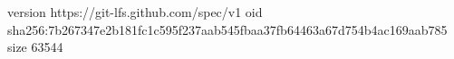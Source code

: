 version https://git-lfs.github.com/spec/v1
oid sha256:7b267347e2b181fc1c595f237aab545fbaa37fb64463a67d754b4ac169aab785
size 63544
